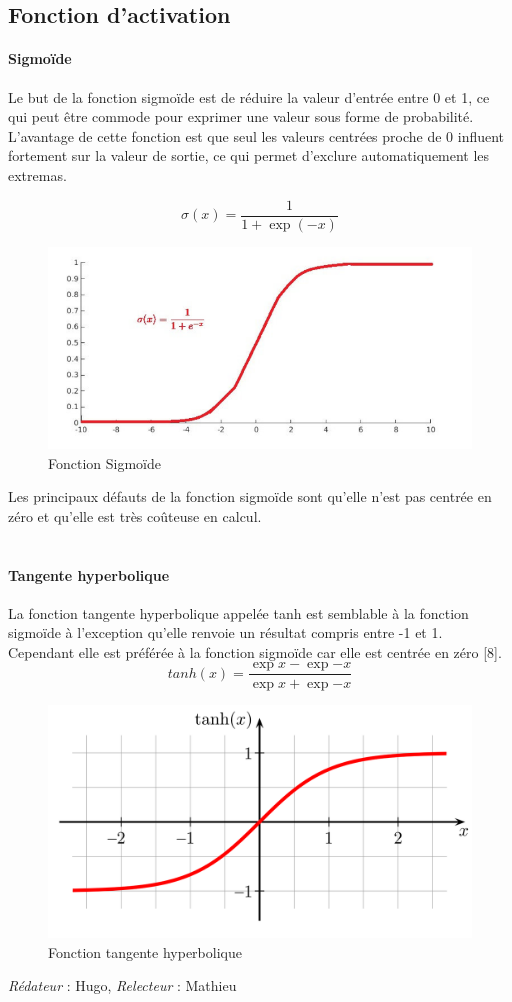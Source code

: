 \documentclass[oneside,a4paper,13pt]{article}
\begin{document}
\subsection*{Fonction d'activation}
\paragraph{Sigmoïde}
Le but de la fonction sigmoïde est de réduire la valeur d'entrée entre 0 et 1, ce qui peut être commode pour exprimer une valeur sous forme de probabilité. L'avantage de cette fonction est que seul les valeurs centrées proche de 0 influent fortement sur la valeur de sortie, ce qui permet d'exclure automatiquement les extremas.

\begin{equation}
    \sigma(x) = \frac{1}{1 + \exp{(-x)}}
\end{equation}
\begin{figure}[H]
    \centering
        \includegraphics[width=0.8\linewidth]{Images/sigmoide.PNG}
        \caption{Fonction Sigmoïde}
        \label{fig:my_label}
\end{figure}
Les principaux défauts de la fonction sigmoïde sont qu'elle n'est pas centrée en zéro et qu'elle est très coûteuse en calcul.\\ \\
\paragraph{Tangente hyperbolique}
La fonction tangente hyperbolique appelée tanh est semblable à la fonction sigmoïde à l'exception qu'elle renvoie un résultat compris entre -1 et 1. Cependant elle est préférée à la fonction sigmoïde car elle est centrée en zéro [8].
\begin{equation}
    tanh(x) = \frac{\exp{x} - \exp{-x}}{\exp{x} + \exp{-x}}
\end{equation}
\begin{figure}[H]
    \centering
        \includegraphics[width=0.8\linewidth]{Images/tanh.png}
        \caption{Fonction tangente hyperbolique}
        \label{fig:my_label}
\end{figure}
\smallbreak\textit{Rédateur} : Hugo, \textit{Relecteur} : Mathieu
\end{document}
